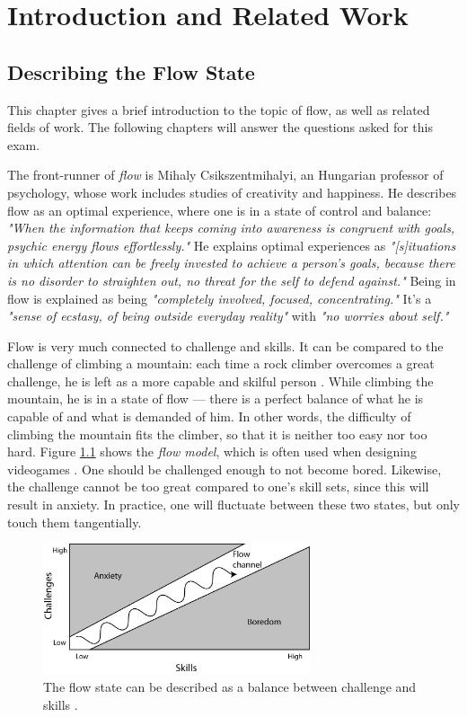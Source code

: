 \chapter{Introduction and Related Work}
\section{Describing the Flow State}
This chapter gives a brief introduction to the topic of flow, as well as related fields of work. The following chapters will answer the questions asked for this exam.

The front-runner of \textit{flow} is Mihaly Csikszentmihalyi, an Hungarian professor of psychology, whose work includes studies of creativity and happiness. He describes flow as an optimal experience, where one is in a state of control and balance: \textit{"When the information that keeps coming into awareness is congruent with goals, psychic energy flows effortlessly."} \citep{flow} He explains optimal experiences as \textit{"[s]ituations in which attention can be freely invested to achieve a person's goals, because there is no disorder to straighten out, no threat for the self to defend against."} \citep{flow} Being in flow is explained as being \textit{"completely  involved, focused, concentrating."} It's a \textit{"sense of ecstasy, of being outside everyday reality"} with \textit{"no worries about self."} \citep{ann_flow}

Flow is very much connected to challenge and skills. It can be compared to the challenge of climbing a mountain: each time a rock climber overcomes a great challenge, he is left as a more capable and skilful person \citep{flow}. While climbing the mountain, he is in a state of flow --- there is a perfect balance of what he is capable of and what is demanded of him. In other words, the difficulty of climbing the mountain fits the climber, so that it is neither too easy nor too hard. Figure \ref{fig:flowModel} shows the \textit{flow model}, which is often used when designing videogames \citep{artOfGameDesign}. One should be challenged enough to not become bored. Likewise, the challenge cannot be too great compared to one's skill sets, since this will result in anxiety. In practice, one will fluctuate between these two states, but only touch them tangentially.

\begin{figure}[htbp]
\centering
\includegraphics[width=0.70\textwidth]{Pictures/flow_model}
\caption{The flow state can be described as a balance between challenge and skills \citep{artOfGameDesign}.}
\label{fig:flowModel}
\end{figure}

